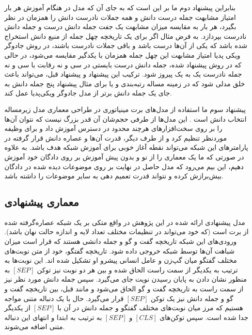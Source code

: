 بنابراین پیشنهاد دوم ما بر این است که به جای آن که مدل در هنگام آموزش هر بار امتیاز مشابهت جمله درست دانش و همه جملات نادرست دانش را همزمان در نظر بگیرد، هر بار به مقایسه میزان مشابهت یک جفت جمله دانش درست و جمله دانش نادرست بپردازد. به فرض مثال اگر برای یک تاریخچه چهل جمله از منبع دانش استخراج شده باشد که یکی از آن‌ها درست باشد و باقی جملات نادرست باشند، در روش جادوگر ویکی پدیا امتیاز مشابهت این چهل جمله همزمان با یکدگیر مقایسه می‌شود، در حالی که در روش پیشنهاد شده، جمله دانش درست بایستی در سی و نه رقابت با سی و نه جمله نادرست یک به یک پیروز شود. ترکیب این پیشنهاد 
و پیشنهاد قبل، می‌تواند باعث خلق مدلی شود که در زمینه مساله رتبه‌بندی 
و یا برای مثال پیشنهاد پنج جمله دانش به جای یک جمله دانش
برتر از مدل جادوگر ویکی‌پدیا عمل کند.

پیشنهاد سوم ما استفاده از مدل‌های برت مینیاتوری در طراحی معماری مدل زیرمساله انتخاب دانش است
\cite{turc2019well}.
این مدل‌ها از طرفی حجم‌شان آن قدر بزرگ نیست که نتوان آن‌ها را بر روی سخت‌افزار‌های هرچند محدود در دسترس آموزش داد و برای وظیفه موردنظر تنظیم کرد و از طرف دیگر، قدرت آ‌ن‌ها و عصاره دانش قرار گرفته در پارامتر‌های این شبکه می‌تواند نقطه آغاز خوبی برای آموزش شبکه هدف باشد. به علاوه در صورتی که ما یک معماری را از نو و بدون پیش آموزش بر روی دادگان خود آموزش دهیم، این بیم می‌رود که مدل حاصل در نهایت بر روی موضوعات دیده شده در دادگان بیش‌برازش کرده و نتواند قدرت تعمیم دهی به سایر موضوعات را داشته باشد. 

\subsection{معماری پیشنهادی}\label{chap4:knowledge_selction:arch}

مدل پیشنهادی ارائه شده در این پژوهش در واقع  متکی بر یک شبکه عصاره‌‌گرفته شده از برت است (که خود می‌تواند در تنظیمات مختلف تعداد لایه و اندازه حالت نهان باشد). 
ورودی‌های این شبکه تاریخچه گفت و گو و جمله دانشی هستند که قرار است میزان شباهت آن‌ها توسط شبکه خروجی داده شود. تاریخچه گفتگو، خود از متن نوبت‌های مختلف گفتگو میان گپ‌زن و عامل انسانی پیشرو او تشکیل شده اند. این نوبت‌ها به ترتیب به یکدیگر از سمت راست الحاق شده و بین هر دو نوبت نیز توکن 
$[SEP]$
به منظور نشان دادن به پایان رسیدن نویت جای می‌گیرد. سپس جمله دانش مورد نظر نیز از سمت راست به تاریخچه گفت و گو الحاق می‌شود و مانند قبل، بین تاریخچه گفت و گو و جمله دانش نیز یک توکن 
$[SEP]$
قرار می‌گیرد. حال با یک دنباله متنی مواجه هستیم که مرز میان نوبت‌های مختلف گفتگو و جمله دانش در آن با 
$[SEP]$
از یکدیگر جدا شده است. سپس توکن‌های 
$[CLS]$
و 
$[SEP]$
به ترتیب به ابتدا و انتهای این دنباله متنی اضافه می‌شوند. 

